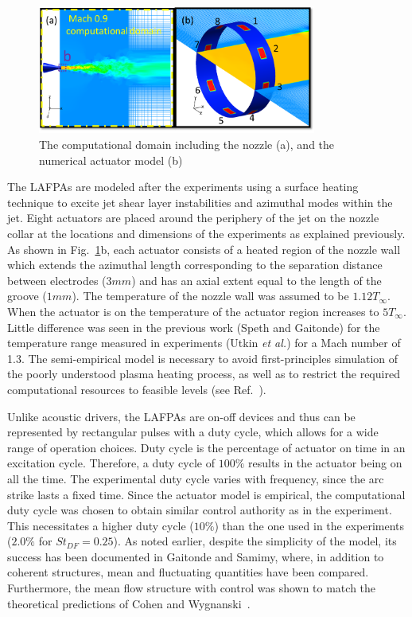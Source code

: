 \documentclass[english]{aiaa-tc}
\begin{document}
\begin{figure}[h]
\begin{center}
\includegraphics[width=3.6in]{actuatormodelnew}
\caption{The computational domain including the nozzle  (a), and the numerical actuator model (b)}\label{fig:actuator}
\end{center}
\end{figure}
The LAFPAs are modeled after the experiments using a surface heating
technique to excite jet shear layer instabilities and azimuthal modes
within the jet.  Eight actuators are placed around the periphery of
the jet on the nozzle collar at the locations and dimensions of the
experiments as explained previously. As shown in
Fig.~\ref{fig:actuator}b, each actuator consists of a heated region of
the nozzle wall which extends the azimuthal length corresponding to
the separation distance between electrodes ($3 mm$) and has an axial
extent equal to the length of the groove ($1 mm$). The temperature of
the nozzle wall was assumed to be $1.12T_{\infty}$.  When the actuator
is on the temperature of the actuator region increases to
$5T_{\infty}$. Little difference was seen in the previous work (Speth
and Gaitonde\cite{SpethASM2012}) for the temperature range measured in
experiments (Utkin {\em et al.}\cite{uyg2007-2}) for a Mach number of
1.3.  The semi-empirical model is necessary to avoid first-principles
simulation of the poorly understood plasma heating process, as well as
to restrict the required computational resources to feasible levels
(see Ref.~).

Unlike acoustic drivers, the LAFPAs are on-off devices and thus can be
represented by rectangular pulses with a duty cycle, which allows for
a wide range of operation choices.  Duty cycle is the percentage of
actuator on time in an excitation cycle. Therefore, a duty cycle
of $100\%$ results in the actuator being on all the time.  
The experimental duty cycle varies with frequency, since the arc
strike lasts a fixed time.  Since the actuator
model is empirical, the computational duty cycle was chosen to obtain
similar control authority as in the experiment.  This necessitates a
higher
duty cycle ($10\%$) than the one used in the experiments
($2.0\%$ for $St_{DF}=0.25$).
As noted earlier, despite the simplicity of the model, its success
has been documented in Gaitonde 
and Samimy\cite{gdv2011-POF}, where, in addition to coherent
structures, mean and fluctuating quantities have been compared.
Furthermore, the mean flow structure with control was shown to match
the theoretical predictions of Cohen and Wygnanski~\cite{cj87-2}.
\end{document}
